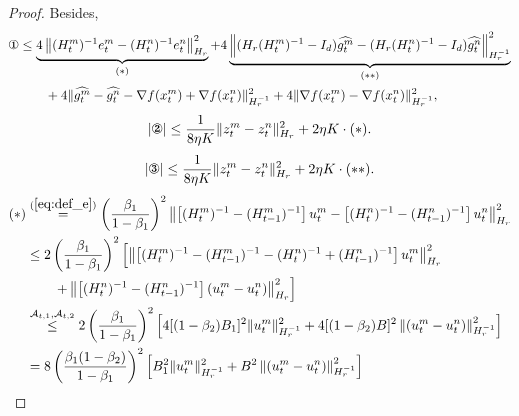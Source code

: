 \documentclass{article} %
\numberwithin{equation}{section}
\newcommand{\cirone}{\text{\ding{172}}}
\newcommand{\cirtwo}{\text{\ding{173}}}
\newcommand{\cirthree}{\text{\ding{174}}}
\renewcommand{\eqref}[1]{(\ref{#1})}
\begin{document}
\begin{proof}
    Besides,
    \begin{equation}\label{eq:cirone}
        \begin{aligned}
            \cirone 
            &\leq \underbrace{4\left\|(H_t^m)^{-1}e_t^m - (H_t^n)^{-1}e_t^n\right\|_{H_r}^2}_{(*)} + 4\underbrace{\left\| (H_r(H_t^m)^{-1}-I_d)\widehat{g_t^m} - (H_r(H_t^n)^{-1}-I_d)\widehat{g_t^n} \right\|_{H_r^{-1}}^2}_{(**)} \\
            &\qquad + 4 \|\widehat{g_t^m}-\widehat{g_t^n}-\nabla f(x_t^m)+\nabla f(x_t^n)\|_{H_r^{-1}}^2 + 4 \|\nabla f(x_t^m)-\nabla f(x_t^n)\|_{H_r^{-1}}^2,
        \end{aligned}
    \end{equation}
    \begin{equation}\label{eq:cirtwo}
        |\cirtwo| 
        \leq \frac{1}{8\eta K}\|z_t^m-z_t^n\|_{H_r}^2 + 2\eta K\cdot(*).
    \end{equation}
    \begin{equation}\label{eq:cirthree}
        |\cirthree| 
        \leq \frac{1}{8\eta K}\|z_t^m-z_t^n\|_{H_r}^2 + 2\eta K\cdot (**).
    \end{equation}
    \begin{equation}\label{eq:4}
        \begin{aligned}
            (*)
            &\overset{\eqref{eq:def_e}}{=}\left(\frac{\beta_1}{1-\beta_1}\right)^2\left\|\left[(H_t^m)^{-1}-(H_{t-1}^m)^{-1}\right]u_t^m-\left[(H_t^n)^{-1}-(H_{t-1}^n)^{-1}\right]u_t^n\right\|_{H_r}^2 \\
            &\leq 2\left(\frac{\beta_1}{1-\beta_1}\right)^2\left[ \left\|\left[(H_t^m)^{-1}-(H_{t-1}^m)^{-1}-(H_t^n)^{-1}+(H_{t-1}^n)^{-1}\right]u_t^m\right\|_{H_r}^2 \right. \\
            &\qquad \left. +\left\|\left[(H_t^n)^{-1}-(H_{t-1}^n)^{-1}\right](u_t^m-u_t^n)\right\|_{H_r}^2\right] \\
            &\overset{\mathcal{A}_{t,1},\mathcal{A}_{t,2}}{\leq} 2\left(\frac{\beta_1}{1-\beta_1}\right)^2\left[ 4[(1-\beta_2)B_1]^2\|u_t^m\|_{H_r^{-1}}^2 +4[(1-\beta_2)B]^2\left\|(u_t^m-u_t^n)\right\|_{H_r^{-1}}^2\right] \\
            &= 8\left(\frac{\beta_1(1-\beta_2)}{1-\beta_1}\right)^2\left[ B_1^2\|u_t^m\|_{H_r^{-1}}^2 +B^2\left\|(u_t^m-u_t^n)\right\|_{H_r^{-1}}^2\right] \\
        \end{aligned}
    \end{equation}
    \begin{equation}\label{eq:5}

\end{equation}
\end{proof}
\end{document}
